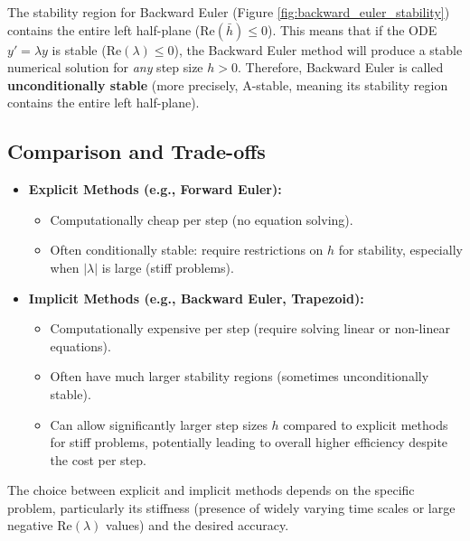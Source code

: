 \documentclass{article}
\begin{document}
The stability region for Backward Euler (Figure \ref{fig:backward_euler_stability}) contains the entire left half-plane ($\text{Re}(\bar{h}) \le 0$). This means that if the ODE $y'=\lambda y$ is stable ($\text{Re}(\lambda) \le 0$), the Backward Euler method will produce a stable numerical solution for \textit{any} step size $h > 0$.
Therefore, Backward Euler is called \textbf{unconditionally stable} (more precisely, A-stable, meaning its stability region contains the entire left half-plane).

\subsection{Comparison and Trade-offs}
\begin{itemize}
    \item \textbf{Explicit Methods (e.g., Forward Euler):}
        \begin{itemize}
            \item Computationally cheap per step (no equation solving).
            \item Often conditionally stable: require restrictions on $h$ for stability, especially when $|\lambda|$ is large (stiff problems).
        \end{itemize}
    \item \textbf{Implicit Methods (e.g., Backward Euler, Trapezoid):}
        \begin{itemize}
            \item Computationally expensive per step (require solving linear or non-linear equations).
            \item Often have much larger stability regions (sometimes unconditionally stable).
            \item Can allow significantly larger step sizes $h$ compared to explicit methods for stiff problems, potentially leading to overall higher efficiency despite the cost per step.
        \end{itemize}
\end{itemize}
The choice between explicit and implicit methods depends on the specific problem, particularly its stiffness (presence of widely varying time scales or large negative $\text{Re}(\lambda)$ values) and the desired accuracy.
\end{document}
